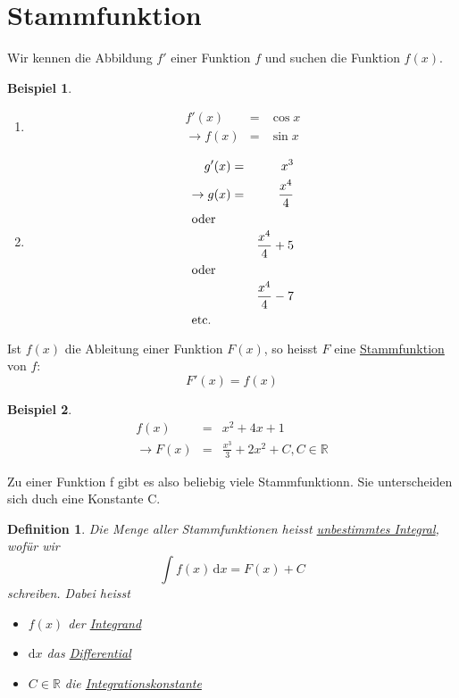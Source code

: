 \documentclass{report}
\newtheorem{mydef}{Definition}
\newtheorem{myexample}{Beispiel}
\newcommand{\R}{{\mathbb R}}
\begin{document}
\section{Stammfunktion}
Wir kennen die Abbildung $f'$ einer Funktion $f$ und suchen die Funktion $f(x)$.\\
\begin{myexample}
	\begin{enumerate}
		\item
		\begin{eqnarray*}
			f'(x) &=& \cos x\\
			\to f(x) &=& \sin x
		\end{eqnarray*}
		\item
		\begin{eqnarray*}
			g'(x) &=& x^3 \\
			\to g(x) &=& \frac{x^4}{4}\\
			\shortintertext{oder}
			&&\frac{x^4}{4} + 5\\
			\shortintertext{oder}
			&&\frac{x^4}{4} -7\\
			\shortintertext{etc.}
		\end{eqnarray*}
	\end{enumerate}
\end{myexample}
\noindent
Ist $f(x)$ die Ableitung einer Funktion $F(x)$, so heisst $F$ eine \underline{Stammfunktion} von $f$:
\begin{equation*}F'(x) = f(x)\end{equation*}
\begin{myexample}
	\begin{eqnarray*}
		f(x) &= &x^2+4x+1\\
		\to F(x) &=& \frac{x^3}{3} + 2 x^2+ C, C \in \R
	\end{eqnarray*}
\end{myexample}
\noindent
Zu einer Funktion f gibt es also beliebig viele Stammfunktionn. Sie unterscheiden sich duch eine Konstante C.\\
\begin{mydef}
	Die Menge aller Stammfunktionen heisst \underline{unbestimmtes Integral}, wofür wir
	\begin{equation*}\int \! f(x) \, \mathrm{d} x = F(x) + C\end{equation*}
	schreiben. Dabei heisst
	\begin{itemize}
		\item $f(x)$ der \underline{Integrand}
		\item $\mathrm{d}x$ das \underline{Differential}
		\item $C \in \mathbb{R}$ die \underline{Integrationskonstante}
	\end{itemize}
\end{mydef}
\end{document}
